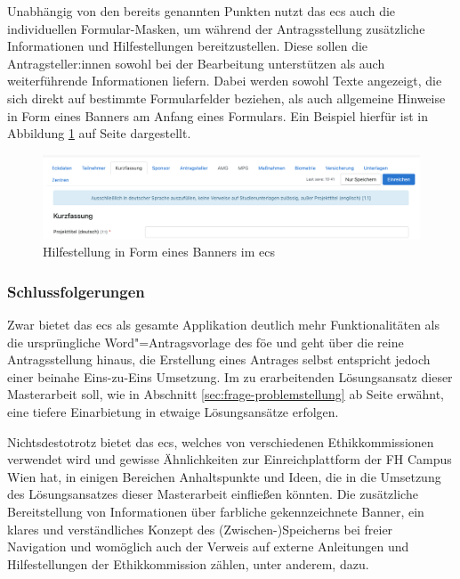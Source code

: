 \documentclass[a4paper,12pt,twoside]{scrreprt}
\begin{document}
\medskip

Unabhängig von den bereits genannten Punkten nutzt das \ac{ecs} auch die individuellen Formular-Masken, um während der Antragsstellung zusätzliche Informationen und Hilfestellungen bereitzustellen. Diese sollen die Antragsteller:innen sowohl bei der Bearbeitung unterstützen als auch weiterführende Informationen liefern. Dabei werden sowohl Texte angezeigt, die sich direkt auf bestimmte Formularfelder beziehen, als auch allgemeine Hinweise in Form eines Banners am Anfang eines Formulars. Ein Beispiel hierfür ist in Abbildung \ref{fig:ecs-banner-hilfestellung} auf Seite \pageref{fig:ecs-banner-hilfestellung} dargestellt.

\begin{figure}[ht]
    \centering
    \includegraphics[width=\linewidth]{thesis/images/Luidold_ECS-Banner-Hilfestellung.png}
    \caption[Hilfestellung in Form eines Banners im \acl{ecs}]{Hilfestellung in Form eines Banners im \acl{ecs} \cite{ethikkommission_der_medizinischen_universitat_innsbruck_ethikkommission_2023}}
    \label{fig:ecs-banner-hilfestellung}
\end{figure}

\subsubsection*{Schlussfolgerungen}
\label{sub-sub-sec:schlussfolgerungen-ecs}

Zwar bietet das \acl{ecs} als gesamte Applikation deutlich mehr Funktionalitäten als die ursprüngliche Word"=Antragsvorlage des \ac{föe} und geht über die reine Antragsstellung hinaus, die Erstellung eines Antrages selbst entspricht jedoch einer beinahe Eins-zu-Eins Umsetzung. Im zu erarbeitenden Lösungsansatz dieser Masterarbeit soll, wie in Abschnitt \ref{sec:frage-problemstellung} ab Seite \pageref{sec:frage-problemstellung} erwähnt, eine tiefere Einarbietung in etwaige Lösungsansätze erfolgen.

Nichtsdestotrotz bietet das \ac{ecs}, welches von verschiedenen Ethikkommissionen verwendet wird und gewisse Ähnlichkeiten zur Einreichplattform der FH Campus Wien hat, in einigen Bereichen Anhaltspunkte und Ideen, die in die Umsetzung des Lösungsansatzes dieser Masterarbeit einfließen könnten. Die zusätzliche Bereitstellung von Informationen über farbliche gekennzeichnete Banner, ein klares und verständliches Konzept des (Zwischen-)Speicherns bei freier Navigation und womöglich auch der Verweis auf externe Anleitungen und Hilfestellungen der Ethikkommission zählen, unter anderem, dazu.
\end{document}
